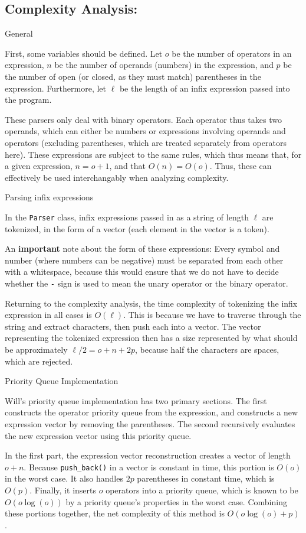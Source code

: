 \documentclass[11pt]{article}
\begin{document}
\subsection*{Complexity Analysis:}

\centerline{General}
First, some variables should be defined.
Let $o$ be the number of operators in an expression, $n$ be the number of operands (numbers) in the expression, and $p$ be the number of open (or closed, as they must match) parentheses in the expression. Furthermore, let $\ell$ be the length of an infix expression passed into the program.

These parsers only deal with binary operators. Each operator thus takes two operands, which can either be numbers or expressions involving operands and operators (excluding parentheses, which are treated separately from operators here).
These expressions are subject to the same rules, which thus means that, for a given expression, $n=o+1$, and that $O(n)=O(o)$.
Thus, these can effectively be used interchangably when analyzing complexity.

\centerline{Parsing infix expressions}
In the \texttt{Parser} class, infix expressions passed in as a string of length $\ell$ are tokenized, in the form of a vector (each element in the vector is a token).

An \textbf{important} note about the form of these expressions: Every symbol and number (where numbers can be negative) must be separated from each other with a whitespace, because this would ensure that we do not have to decide whether the \texttt{-} sign is used to mean the unary operator or the binary operator.

Returning to the complexity analysis, the time complexity of tokenizing the infix expression in all cases is $O(\ell)$.
This is because we have to traverse through the string and extract characters, then push each into a vector.
The vector representing the tokenized expression then has a size represented by what should be approximately $\ell / 2 = o + n + 2p$, because half the characters are spaces, which are rejected.

\centerline{Priority Queue Implementation}
Will's priority queue implementation has two primary sections.
The first constructs the operator priority queue from the expression, and constructs a new expression vector by removing the parentheses.
The second recursively evaluates the new expression vector using this priority queue.

In the first part, the expression vector reconstruction creates a vector of length $o + n$.
Because \texttt{push\_back()} in a vector is constant in time, this portion is $O(o)$ in the worst case.
It also handles $2p$ parentheses in constant time, which is $O(p)$.
Finally, it inserts $o$ operators into a priority queue, which is known to be $O(o\log(o))$ by a priority queue's properties in the worst case.
Combining these portions together, the net complexity of this method is $O(o\log(o) + p)$.
\end{document}
